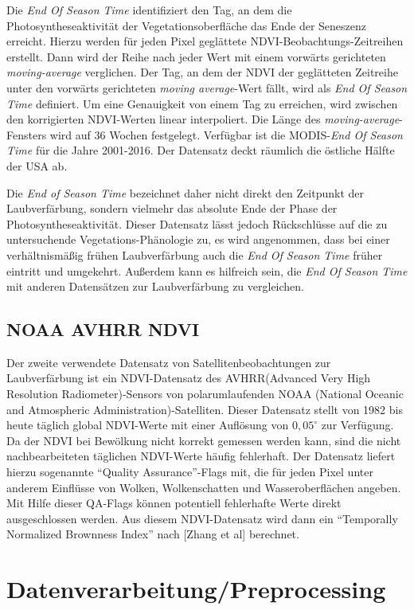 \documentclass[]{article}
\begin{document}
Die \textit{End Of Season Time} identifiziert den Tag, an dem die Photosyntheseaktivität der Vegetationsoberfläche das Ende der Seneszenz erreicht. Hierzu werden für jeden Pixel geglättete NDVI-Beobachtungs-Zeitreihen erstellt. Dann wird der Reihe nach jeder Wert mit einem vorwärts gerichteten \textit{moving-average} verglichen. Der Tag, an dem der NDVI der geglätteten Zeitreihe unter den vorwärts gerichteten \textit{moving average}-Wert fällt, wird als \textit{End Of Season Time} definiert. Um eine Genauigkeit von einem Tag zu erreichen, wird zwischen den korrigierten NDVI-Werten linear interpoliert. Die Länge des \textit{moving-average}-Fensters wird auf 36 Wochen festgelegt. Verfügbar ist die MODIS-\textit{End Of Season Time} für die Jahre 2001-2016. Der Datensatz deckt räumlich die östliche Hälfte der USA ab.

Die \textit{End of Season Time} bezeichnet daher nicht direkt den Zeitpunkt der Laubverfärbung, sondern vielmehr das absolute Ende der Phase der Photosyntheseaktivität. Dieser Datensatz lässt jedoch Rückschlüsse auf die zu untersuchende Vegetations-Phänologie zu, es wird angenommen, dass bei einer verhältnismäßig frühen Laubverfärbung auch die \textit{End Of Season Time} früher eintritt und umgekehrt. Außerdem kann es hilfreich sein, die \textit{End Of Season Time} mit anderen Datensätzen zur Laubverfärbung zu vergleichen.
\subsection{NOAA AVHRR NDVI}
Der zweite verwendete Datensatz von Satellitenbeobachtungen zur Laubverfärbung ist ein NDVI-Datensatz des AVHRR(Advanced Very High Resolution Radiometer)-Sensors von polarumlaufenden NOAA (National Oceanic and Atmospheric Administration)-Satelliten. Dieser Datensatz stellt von 1982 bis heute täglich global NDVI-Werte mit einer Auflösung von $0,05^\circ$ zur Verfügung. Da der NDVI bei Bewölkung nicht korrekt gemessen werden kann, sind die nicht nachbearbeiteten täglichen NDVI-Werte häufig fehlerhaft. Der Datensatz liefert hierzu sogenannte \enquote{Quality Assurance}-Flags mit, die für jeden Pixel unter anderem Einflüsse von Wolken, Wolkenschatten und Wasseroberflächen angeben. Mit Hilfe dieser QA-Flags können potentiell fehlerhafte Werte direkt ausgeschlossen werden. Aus diesem NDVI-Datensatz wird dann ein \enquote{Temporally Normalized Brownness Index} nach [Zhang et al] berechnet.       
\section{Datenverarbeitung/Preprocessing}
\end{document}

